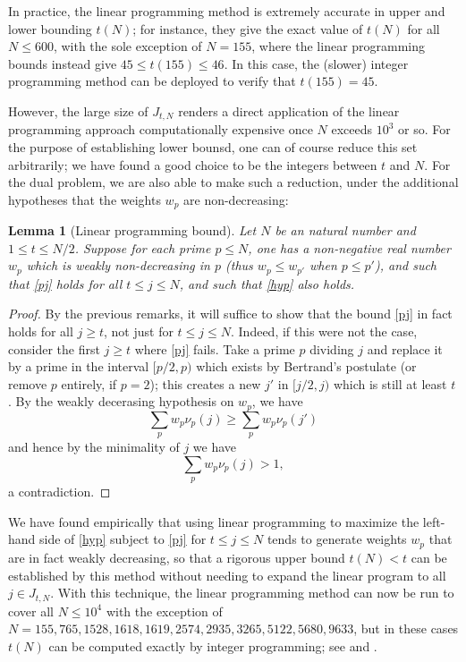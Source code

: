 \documentclass[12pt,a4paper,reqno]{amsart}
\numberwithin{equation}{section}
\theoremstyle{plain}
\newtheorem{lemma}[theorem]{Lemma}
\theoremstyle{definition}
\begin{document}
In practice, the linear programming method is extremely accurate in upper and lower bounding $t(N)$; for instance, they give the exact value of $t(N)$ for all $N \leq 600$, with the sole exception of $N=155$, where the linear programming bounds instead give $45 \leq t(155) \leq 46$.  In this case, the (slower) integer programming method can be deployed to verify that $t(155)=45$.


However, the large size of $J_{t,N}$ renders a direct application of the linear programming approach computationally expensive once $N$ exceeds $10^3$ or so.  For the purpose of establishing lower bounsd, one can of course reduce this set arbitrarily; we have found a good choice to be the integers between $t$ and $N$.  For the dual problem, we are also able to make such a reduction, under the additional hypotheses that the weights $w_p$ are non-decreasing:
  
\begin{lemma}[Linear programming bound]\label{lp-upper}  Let $N$ be an natural number and $1 \leq t \leq N/2$.  Suppose for each prime $p \leq N$, one has a non-negative real number $w_p$ which is weakly non-decreasing in $p$ (thus $w_p \leq w_{p'}$ when $p \leq p'$), and such that \eqref{pj} holds
  for all $t \leq j \leq N$, and such that \eqref{hyp} also holds.
\end{lemma}
  
\begin{proof}
By the previous remarks, it will suffice to show that the bound \eqref{pj} in fact holds for all $j \geq t$, not just for $t \leq j \leq N$.  Indeed, if this were not the case, consider the first $j \geq t$ where \eqref{pj} fails.  Take a prime $p$ dividing $j$ and replace it by a prime in the interval $[p/2,p)$ which exists by Bertrand's postulate (or remove $p$ entirely, if $p=2$); this creates a new $j'$ in $[j/2,j)$ which is still at least $t$.  By the weakly decerasing hypothesis on $w_p$, we have
  $$ \sum_p w_p \nu_p(j) \geq \sum_p w_p \nu_p(j')$$
  and hence by the minimality of $j$ we have
  $$ \sum_p w_p \nu_p(j) > 1, $$
  a contradiction.
\end{proof}
  
We have found empirically that using linear programming to maximize the left-hand side of \eqref{hyp} subject to \eqref{pj} for $t \leq j \leq N$ tends to generate weights $w_p$ that are in fact weakly decreasing, so that a rigorous upper bound $t(N) < t$ can be established by this method without needing to expand the linear program to all $j \in J_{t,N}$.  With this technique, the linear programming method can now be run to cover all $N \leq 10^4$ with the exception of $N=155,765,1528,1618,1619,2574,2935,3265,5122,5680,9633$, but in these cases $t(N)$ can be computed exactly by integer programming; see \cite{github} and .
\end{document}

